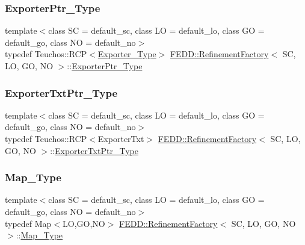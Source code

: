 \subsubsection{\texorpdfstring{Exporter\+Ptr\+\_\+\+Type}{ExporterPtr\_Type}}
{\footnotesize\ttfamily template$<$class SC  = default\+\_\+sc, class LO  = default\+\_\+lo, class GO  = default\+\_\+go, class NO  = default\+\_\+no$>$ \\
typedef Teuchos\+::\+R\+CP$<$\hyperlink{classFEDD_1_1RefinementFactory_a268cb28ca6c68a4c32a912068c643933}{Exporter\+\_\+\+Type}$>$ \hyperlink{classFEDD_1_1RefinementFactory}{F\+E\+D\+D\+::\+Refinement\+Factory}$<$ SC, LO, GO, NO $>$\+::\hyperlink{classFEDD_1_1RefinementFactory_ae74a8143ddf273f2a13df4055233759c}{Exporter\+Ptr\+\_\+\+Type}}

\mbox{\label{classFEDD_1_1RefinementFactory_a08c0a0d5b375af33c924f90005302f91}} 
\subsubsection{\texorpdfstring{Exporter\+Txt\+Ptr\+\_\+\+Type}{ExporterTxtPtr\_Type}}
{\footnotesize\ttfamily template$<$class SC  = default\+\_\+sc, class LO  = default\+\_\+lo, class GO  = default\+\_\+go, class NO  = default\+\_\+no$>$ \\
typedef Teuchos\+::\+R\+CP$<$Exporter\+Txt$>$ \hyperlink{classFEDD_1_1RefinementFactory}{F\+E\+D\+D\+::\+Refinement\+Factory}$<$ SC, LO, GO, NO $>$\+::\hyperlink{classFEDD_1_1RefinementFactory_a08c0a0d5b375af33c924f90005302f91}{Exporter\+Txt\+Ptr\+\_\+\+Type}}

\mbox{\label{classFEDD_1_1RefinementFactory_ae3b9a462f8534ab43ce0dbf0d44b3bc5}} 
\subsubsection{\texorpdfstring{Map\+\_\+\+Type}{Map\_Type}}
{\footnotesize\ttfamily template$<$class SC  = default\+\_\+sc, class LO  = default\+\_\+lo, class GO  = default\+\_\+go, class NO  = default\+\_\+no$>$ \\
typedef Map$<$LO,GO,NO$>$ \hyperlink{classFEDD_1_1RefinementFactory}{F\+E\+D\+D\+::\+Refinement\+Factory}$<$ SC, LO, GO, NO $>$\+::\hyperlink{classFEDD_1_1RefinementFactory_ae3b9a462f8534ab43ce0dbf0d44b3bc5}{Map\+\_\+\+Type}}

